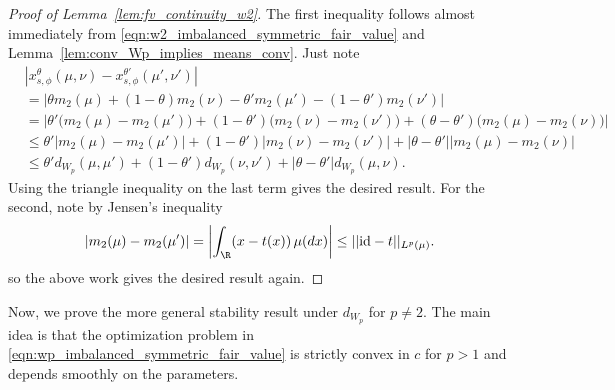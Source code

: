 \begin{proof}[Proof of Lemma~\ref{lem:fv_continuity_w2}]
    The first inequality follows almost immediately from \eqref{eqn:w2_imbalanced_symmetric_fair_value}
    and Lemma~\ref{lem:conv_Wp_implies_means_conv}. Just note
    \begin{align*}
        &\left|x_{s,\phi}^\theta(\mu, \nu) - x_{s,\phi}^{\theta'}(\mu', \nu')\right|\\
        &=
        \left|
        \theta m_2(\mu) + (1-\theta)m_2(\nu)
        - \theta' m_2(\mu') - (1-\theta')m_2(\nu')
        \right| \\[5pt]
        &=
        \left|
        \theta' \bigl(m_2(\mu)-m_2(\mu')\bigr)
        + (1-\theta')\bigl(m_2(\nu)-m_2(\nu')\bigr)
        + (\theta-\theta')\bigl(m_2(\mu)-m_2(\nu)\bigr)
        \right| \\[5pt]
        &\leq
        \theta' \left|m_2(\mu)-m_2(\mu')\right|
        + (1-\theta') \left|m_2(\nu)-m_2(\nu')\right|
        + |\theta-\theta'| \left|m_2(\mu)-m_2(\nu)\right| \\[5pt]
        &\leq
        \theta' d_{W_p}(\mu,\mu')
        + (1-\theta') d_{W_p}(\nu,\nu')
        + |\theta-\theta'| d_{W_p}(\mu,\nu).
    \end{align*}
    Using the triangle inequality on the last term gives the desired result. For the second, note by Jensen's inequality
    \[|m_2(\mu)-m_2(\mu')| = \left|\int_\R (x-t(x))\,\mu(dx)\right| \leq ||\mathrm{id}-t||_{L^p(\mu)}.\]
    \noindent so the above work gives the desired result again.
\end{proof}

\noindent Now, we prove the more general stability result under $d_{W_p}$ for $p \neq 2$.
The main idea is that the optimization problem in \eqref{eqn:wp_imbalanced_symmetric_fair_value} is strictly convex in $c$ for $p > 1$ and depends smoothly on the parameters.

